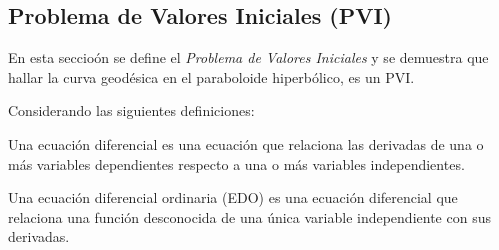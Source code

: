 \documentclass{endm}
\begin{document}
\subsection{Problema de Valores Iniciales (PVI)}\label{PVI}

\tab En esta seccio\'on se define el \textit{Problema de Valores Iniciales} y se demuestra que hallar la curva geod\'esica en el paraboloide hiperb\'olico, es un PVI.

Considerando las siguientes definiciones\cite{notasMN}:

\begin{defn}
Una ecuaci\'on diferencial es una ecuaci\'on que relaciona las derivadas de una o m\'as variables dependientes respecto a una o m\'as variables independientes.
\end{defn}

\begin{defn}
Una ecuaci\'on diferencial ordinaria (EDO) es una ecuaci\'on diferencial que relaciona una funci\'on desconocida de una \'unica variable independiente con sus derivadas.
\end{defn}


    
    
    
 
\end{document}
